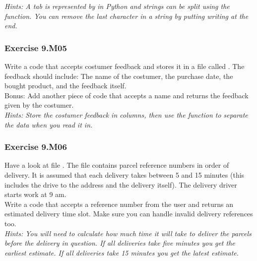 \textit{Hints:
A tab is represented by {} in Python and strings can be split using the {} function. You can remove the last character in a string by putting writing {} at the end.}\\[1cm]


\subsubsection*{Exercise 9.M05}
Write a code that accepts costumer feedback and stores it in a file called {}. The feedback should include: The name of the costumer, the purchase date, the bought product, and the feedback itself.\\
Bonus: Add another piece of code that accepts a name and returns the feedback given by the costumer.\\

\textit{Hints:
Store the costumer feedback in columns, then use the {} function to separate the data when you read it in.}\\[1cm]


\subsubsection*{Exercise 9.M06}
Have a look at file {}. The file contains parcel
reference numbers in order of delivery. It is assumed that each delivery takes between 5 and
15 minutes (this includes the drive to the address and the delivery itself). The delivery driver starts work at 9 am.\\
Write a code that accepts a reference number from the user and returns an estimated
delivery time slot. Make sure you can handle invalid delivery references too.\\


\textit{Hints:
You will need to calculate how much time it will take to deliver the parcels before the delivery in question. If all deliveries take five minutes you get the earliest estimate. If all deliveries take 15 minutes you get the latest estimate.}\\[1cm]


